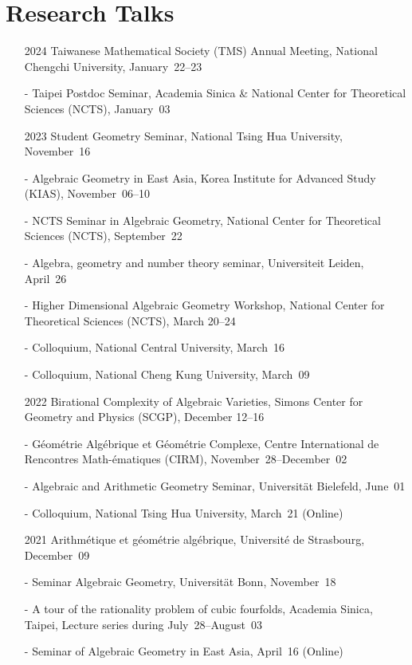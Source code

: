\documentclass[12pt]{article}
\begin{document}
\section*{Research Talks}
\begin{itemize}[leftmargin=!, itemsep=0pt]
	\item[2024] Taiwanese Mathematical Society (TMS) Annual Meeting, National Chengchi University, January~22--23
	\item[-] Taipei Postdoc Seminar, Academia Sinica \& National Center for Theoretical Sciences (NCTS), January~03
	\item[2023] Student Geometry Seminar, National Tsing Hua University, November~16
	\item[-] Algebraic Geometry in East Asia, Korea Institute for Advanced Study (KIAS), November~06--10
	\item[-] NCTS Seminar in Algebraic Geometry, National Center for Theoretical Sciences (NCTS), September~22
	\item[-] Algebra, geometry and number theory seminar, Universiteit Leiden, April~26
	\item[-] Higher Dimensional Algebraic Geometry Workshop, National Center for Theoretical Sciences (NCTS), March 20--24
	\item[-] Colloquium, National Central University, March~16
	\item[-] Colloquium, National Cheng Kung University, March~09
	\item[2022] Birational Complexity of Algebraic Varieties, Simons Center for Geometry and Physics (SCGP), December 12--16
	\item[-] G\'eom\'etrie Alg\'ebrique et G\'eom\'etrie Complexe, Centre International de Rencontres Math-\'{e}matiques (CIRM), November~28--December~02
	\item[-] Algebraic and Arithmetic Geometry Seminar, Universit\"at Bielefeld, June~01
	\item[-] Colloquium, National Tsing Hua University, March~21 (Online)
	\item[2021] Arithm\'etique et g\'eométrie alg\'ebrique, Universit\'e de Strasbourg, December~09
	\item[-] Seminar Algebraic Geometry, Universit\"{a}t Bonn, November~18
	\item[-] A tour of the rationality problem of cubic fourfolds, Academia Sinica, Taipei, Lecture series during July~28--August~03
	\item[-] Seminar of Algebraic Geometry in East Asia, April~16 (Online)

\end{itemize}
\end{document}
